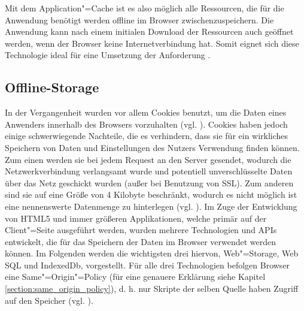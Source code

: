 Mit dem Application"=Cache ist es also möglich alle Ressourcen, die für die Anwendung benötigt werden offline im Browser zwischenzuspeichern. Die Anwendung kann nach einem initialen Download der Ressourcen auch geöffnet werden, wenn der Browser keine Internetverbindung hat. Somit eignet sich diese Technologie ideal für eine Umsetzung der Anforderung .

\subsection{Offline-Storage}\label{section:offline_storage}
In der Vergangenheit wurden vor allem Cookies benutzt, um die Daten eines Anwenders innerhalb des Browsers vorzuhalten (vgl. \cite{Mahemoff22010}). Cookies haben jedoch einige schwerwiegende Nachteile, die es verhindern, dass sie für ein wirkliches Speichern von Daten und Einstellungen des Nutzers Verwendung finden können. Zum einen werden sie bei jedem Request an den Server gesendet, wodurch die Netzwerkverbindung verlangsamt wurde und potentiell unverschlüsselte Daten über das Netz geschickt wurden (außer bei Benutzung von \ac{SSL}). Zum anderen sind sie auf eine Größe von 4 Kilobyte beschränkt, wodurch es nicht möglich ist eine nennenswerte Datenmenge zu hinterlegen (vgl. \cite{html5upandrunningchapter7}). Im Zuge der Entwicklung von \ac{HTML}5 und immer größeren Applikationen, welche primär auf der Client"=Seite ausgeführt werden, wurden mehrere Technologien und \acp{API} entwickelt, die für das Speichern der Daten im Browser verwendet werden können. Im Folgenden werden die wichtigsten drei hiervon, Web"=Storage, Web \ac{SQL} und IndexedDb, vorgestellt. Für alle drei Technologien befolgen Browser eine Same"=Origin"=Policy (für eine genauere Erklärung siehe Kapitel \ref{section:same_origin_policy}), d. h. nur Skripte der selben Quelle haben Zugriff auf den Speicher (vgl. \cite{Mahemoff2010}).

